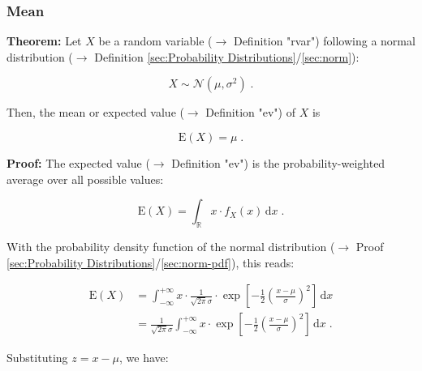 \documentclass[a4paper,12pt]{book}
\begin{document}
\subsubsection[\textbf{Mean}]{Mean} \label{sec:norm-mean}

\vspace{1em}
\textbf{Theorem:} Let $X$ be a random variable ($\rightarrow$ Definition "rvar") following a normal distribution ($\rightarrow$ Definition \ref{sec:Probability Distributions}/\ref{sec:norm}):

\begin{equation} \label{eq:norm-mean-norm}
X \sim \mathcal{N}(\mu, \sigma^2) \; .
\end{equation}

Then, the mean or expected value ($\rightarrow$ Definition "ev") of $X$ is

\begin{equation} \label{eq:norm-mean-norm-mean}
\mathrm{E}(X) = \mu \; .
\end{equation}


\vspace{1em}
\textbf{Proof:} The expected value ($\rightarrow$ Definition "ev") is the probability-weighted average over all possible values:

\begin{equation} \label{eq:norm-mean-mean}
\mathrm{E}(X) = \int_{\mathbb{R}} x \cdot f_X(x) \, \mathrm{d}x \; .
\end{equation}

With the probability density function of the normal distribution ($\rightarrow$ Proof \ref{sec:Probability Distributions}/\ref{sec:norm-pdf}), this reads:

\begin{equation} \label{eq:norm-mean-norm-mean-s1}
\begin{split}
\mathrm{E}(X) &= \int_{-\infty}^{+\infty} x \cdot \frac{1}{\sqrt{2 \pi} \sigma} \cdot \exp \left[ -\frac{1}{2} \left( \frac{x-\mu}{\sigma} \right)^2 \right] \, \mathrm{d}x \\
&= \frac{1}{\sqrt{2 \pi} \sigma} \int_{-\infty}^{+\infty} x \cdot \exp \left[ -\frac{1}{2} \left( \frac{x-\mu}{\sigma} \right)^2 \right] \, \mathrm{d}x \; .
\end{split}
\end{equation}

Substituting $z = x -\mu$, we have:
\end{document}

